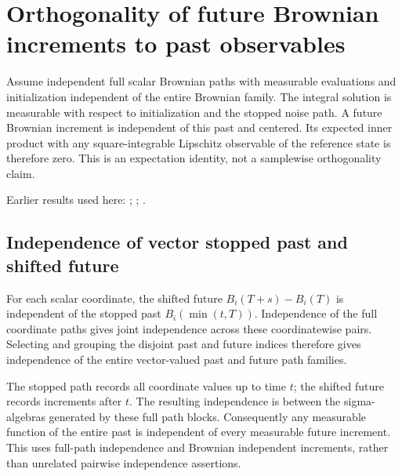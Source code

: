 \documentclass[11pt,a4paper]{report}
\begin{document}
\section{\texorpdfstring{Orthogonality of future Brownian increments to past observables}{Orthogonality of future Brownian increments to past observables}}
\label{proof-module-ProximalLangevin-SplittingOrthogonality-lean}


Assume independent full scalar Brownian paths with measurable evaluations and initialization independent of the entire Brownian family. The integral solution is measurable with respect to initialization and the stopped noise path. A future Brownian increment is independent of this past and centered. Its expected inner product with any square-integrable Lipschitz observable of the reference state is therefore zero. This is an expectation identity, not a samplewise orthogonality claim.



Earlier results used here: \cite[Section~3.54]{LangevinLean2026ULASC}; \cite[Section~3.25]{LangevinLean2026ULASC}; \cite[Section~3.31]{LangevinLean2026ULASC}.
\subsection{\texorpdfstring{Independence of vector stopped past and shifted future}{Independence of vector stopped past and shifted future}}
\label{report-step-ProximalLangevin-SplittingOrthogonality-lean-1}


For each scalar coordinate, the shifted future \(B_i(T+s)-B_i(T)\) is independent of the stopped past \(B_i(\min(t,T))\). Independence of the full coordinate paths gives joint independence across these coordinatewise pairs. Selecting and grouping the disjoint past and future indices therefore gives independence of the entire vector-valued past and future path families.



The stopped path records all coordinate values up to time \(t\); the shifted future records increments after \(t\). The resulting independence is between the sigma-algebras generated by these full path blocks. Consequently any measurable function of the entire past is independent of every measurable future increment. This uses full-path independence and Brownian independent increments, rather than unrelated pairwise independence assertions.
\end{document}
